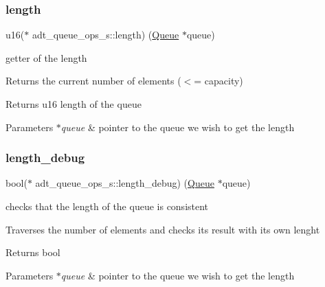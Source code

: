 \subsubsection{\texorpdfstring{length}{length}}
{\footnotesize\ttfamily u16($\ast$ adt\+\_\+queue\+\_\+ops\+\_\+s\+::length) (\hyperlink{structadt__queue__s}{Queue} $\ast$queue)}



getter of the length 

Returns the current number of elements ($<$= capacity)

\begin{DoxyReturn}{Returns}
u16 length of the queue 
\end{DoxyReturn}

\begin{DoxyParams}{Parameters}
{\em $\ast$queue} & pointer to the queue we wish to get the length \\
\hline
\end{DoxyParams}
\mbox{\label{structadt__queue__ops__s_a6c8ce700a1008913e4431604abe85532}} 
\subsubsection{\texorpdfstring{length\+\_\+debug}{length\_debug}}
{\footnotesize\ttfamily bool($\ast$ adt\+\_\+queue\+\_\+ops\+\_\+s\+::length\+\_\+debug) (\hyperlink{structadt__queue__s}{Queue} $\ast$queue)}



checks that the length of the queue is consistent 

Traverses the number of elements and checks its result with its own lenght

\begin{DoxyReturn}{Returns}
bool 
\end{DoxyReturn}

\begin{DoxyParams}{Parameters}
{\em $\ast$queue} & pointer to the queue we wish to get the length \\
\hline
\end{DoxyParams}
\mbox{\label{structadt__queue__ops__s_a1cebc2ba794814b795e5e10da79c7090}} 
